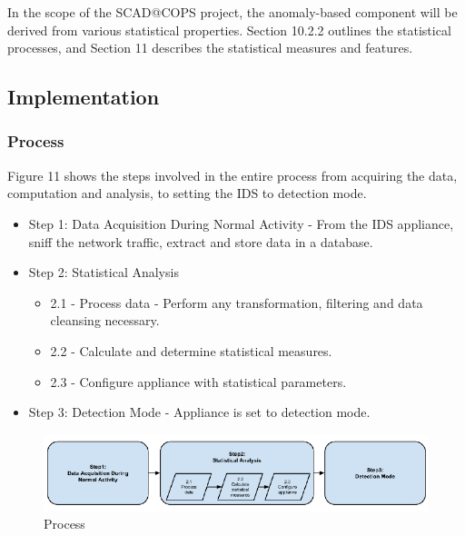 \documentclass[12pt,]{article}
\begin{document}
In the scope of the SCAD@COPS project, the anomaly-based component will
be derived from various statistical properties. Section 10.2.2 outlines
the statistical processes, and Section 11 describes the statistical
measures and features.

\subsection{Implementation}\label{implementation}

\subsubsection{Process}\label{process}

Figure 11 shows the steps involved in the entire process from acquiring
the data, computation and analysis, to setting the IDS to detection
mode.

\begin{itemize}
\itemsep1pt\parskip0pt
\item
  Step 1: Data Acquisition During Normal Activity - From the IDS
  appliance, sniff the network traffic, extract and store data in a
  database.
\item
  Step 2: Statistical Analysis

  \begin{itemize}
  \itemsep1pt\parskip0pt
  \item
    2.1 - Process data - Perform any transformation, filtering and data
    cleansing necessary.
  \item
    2.2 - Calculate and determine statistical measures.
  \item
    2.3 - Configure appliance with statistical parameters.
  \end{itemize}
\item
  Step 3: Detection Mode - Appliance is set to detection mode.
\end{itemize}

\begin{figure}

{\centering \includegraphics{thesis_files/figure-latex/unnamed-chunk-40-1} 

}

\caption{Process}\label{fig:unnamed-chunk-40}
\end{figure}
\end{document}
